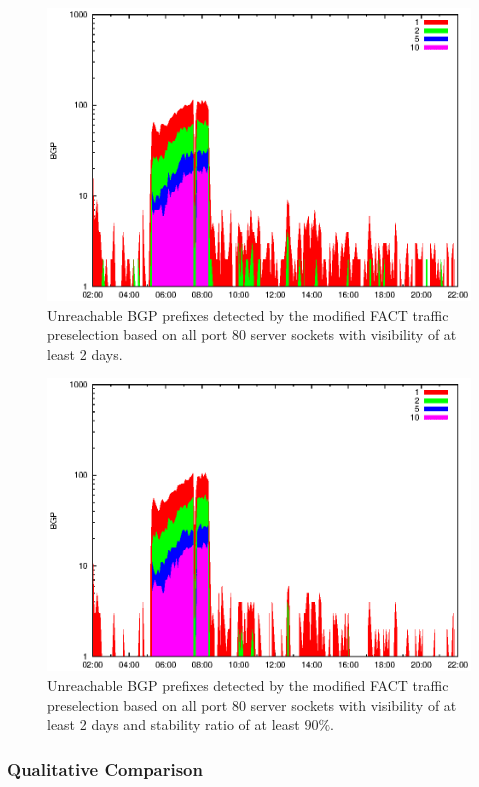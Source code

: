 \begin{figure}
	[htbp] \centering 
	\includegraphics[width=0.75\linewidth]{images/events/2010_03_25/bgp_log_port80_Set_stab_0_vts_2.eps}
	\caption{Unreachable BGP prefixes detected by the modified FACT traffic preselection based on all port 80 server sockets with visibility of at least 2 days.} 
	\label{fig:AMS_IX_FACT_allSES80VTS2} 
\end{figure}

\begin{figure}
	[htbp] \centering 
	\includegraphics[width=0.75\linewidth]{images/events/2010_03_25/bgp_log_port80_Set_stab_9_vts_2.eps}
	\caption{Unreachable BGP prefixes detected by the modified FACT traffic preselection based on all port 80 server sockets with visibility of at least 2 days and stability ratio of at least $90\%$.} 
	\label{fig:AMS_IX_FACT_allSES80VTS2} 
\end{figure}


\subsubsection{Qualitative Comparison}


